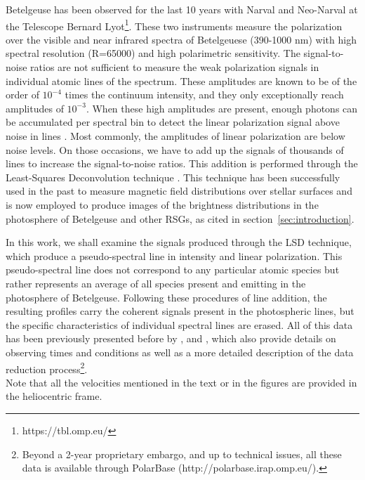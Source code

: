 \documentclass{aa}
\begin{document}
Betelgeuse has been observed for the last 10 years with Narval and Neo-Narval at the Telescope Bernard Lyot\footnote[1]{https://tbl.omp.eu/}. These two instruments measure the polarization 
over the visible and near infrared spectra of Betelgeuese (390-1000 nm) with high spectral resolution (R=65000) and high polarimetric sensitivity. The signal-to-noise ratios are not sufficient to measure the weak polarization signals in individual atomic lines of the 
spectrum. These amplitudes are known to be of the order of $10^{-4}$ times the continuum intensity, and they only exceptionally reach amplitudes of $10^{-3}$. When these high amplitudes are present, enough photons can be accumulated per spectral bin to 
detect the linear polarization signal above noise in lines \citep{auriere_discovery_2016}. Most commonly, the amplitudes of linear polarization are below noise levels. On those 
occasions, we have to add up the signals of thousands of lines to increase the signal-to-noise ratios. This addition 
is performed through the Least-Squares Deconvolution technique \citep[LSD;][]{donati_spectropolarimetric_1997,2010A&A...524A...5K}.%
This technique has been successfully used in the past to measure 
magnetic field distributions over stellar surfaces \citep[e.g][]{donatiLandstreet2009,reiners2012,kochukhov2021} and is now employed to produce images of the brightness distributions in the photosphere 
of Betelgeuse and other RSGs, as cited in section~\ref{sec:introduction}. 

In this work, we shall examine the signals produced through the LSD technique, which produce a pseudo-spectral line in intensity 
and linear polarization. This pseudo-spectral line does not correspond to any particular atomic species but rather represents an average of all species present and emitting in the 
photosphere of Betelgeuse. Following these procedures of line addition, the resulting profiles carry the coherent signals present in the photospheric lines, but the specific characteristics of individual spectral lines are erased. All of this data has been previously presented before by \cite{auriere_discovery_2016}, \cite{mathias_evolution_2018} and 
\cite{lopez_ariste_three-dimensional_2022}, which also provide details on observing times and conditions as well as a more detailed description 
of the data reduction process\footnote[2]{Beyond a 2-year proprietary embargo, and up to technical issues, all these data is available through 
PolarBase (http://polarbase.irap.omp.eu/).}.\\
Note that all the velocities mentioned in the text or in the figures are provided in the heliocentric frame.
\end{document}
